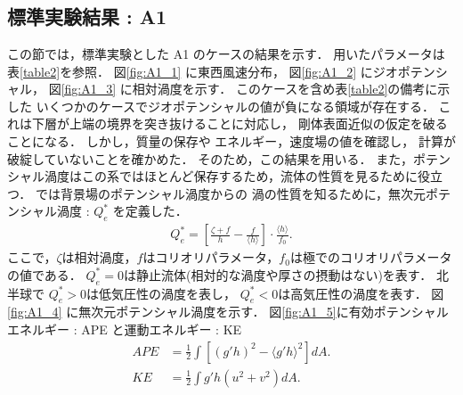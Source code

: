 \documentclass[a4j,12pt,openbib,oneside]{jreport}
\begin{document}
\chapter{}
\label{chap:3}
%
\section{標準実験結果 : A1}
\label{sec:A1}
この節では，標準実験とした A1 のケースの結果を示す．
用いたパラメータは表\ref{table2}を参照．
図\ref{fig:A1_1} に東西風速分布，
図\ref{fig:A1_2} にジオポテンシャル，
図\ref{fig:A1_3} に相対渦度を示す．
このケースを含め表\ref{table2}の備考に示した
いくつかのケースでジオポテンシャルの値が負になる領域が存在する．
これは下層が上端の境界を突き抜けることに対応し，
剛体表面近似の仮定を破ることになる．
しかし，質量の保存や
エネルギー，速度場の値を確認し，
計算が破綻していないことを確かめた．
そのため，この結果を用いる．
%
%
%
%
%
また，ポテンシャル渦度はこの系ではほとんど保存するため，流体の性質を見るために役立つ．
\cite{Brueshaber2019} では背景場のポテンシャル渦度からの
渦の性質を知るために，無次元ポテンシャル渦度 : $Q_e^*$ を定義した．
\begin{align}
Q_e^* = \left [\frac{\zeta+f}{h}-\frac{f}{\langle h \rangle}\right]\cdot \frac{\langle h \rangle}{f_0}. \label{eq:nonqv}
\end{align}
ここで，$\zeta$は相対渦度，$f$はコリオリパラメータ，$f_0$は極でのコリオリパラメータの値である．
%
$Q_e^*=0$は静止流体(相対的な渦度や厚さの摂動はない)を表す．
北半球で $Q_e^*>0$は低気圧性の渦度を表し，
$Q_e^*<0$は高気圧性の渦度を表す．
%
図\ref{fig:A1_4} に無次元ポテンシャル渦度を示す．
%
図\ref{fig:A1_5}に有効ポテンシャルエネルギー : APE と運動エネルギー : KE 
\begin{align}
APE &= \frac{1}{2} \int \left[(g'h)^2 - \langle g'h \rangle^2   \right] dA. \label{eq:APE} \\
KE  &= \frac{1}{2} \int g'h(u^2 + v^2) dA. \label{eq:KE}
\end{align}
\end{document}
